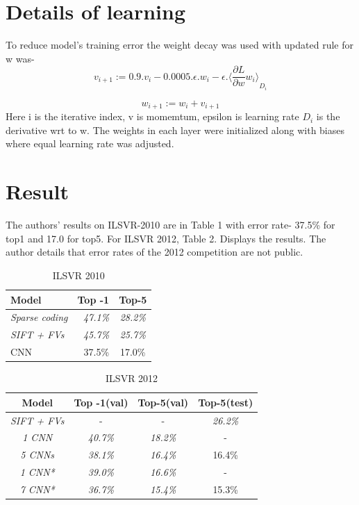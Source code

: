 \documentclass{article}
\begin{document}
\section{Details of learning}
To reduce model’s training error the weight decay was used with updated rule for w was-
$$v_{i+1} := 0.9 .v_i -0.0005 . \epsilon . w_i - \epsilon . {\langle
{\frac{\partial L}{\partial w}{w_i}}\rangle}_{D_i}$$

$$ w_{i+1} := w_i + v_{i+1}$$
\vspace{0.1in}
Here i is the iterative index,
v is momemtum, epsilon is learning rate ${D_i}$ is the derivative wrt to w.
The weights in each layer were initialized along with biases where equal learning rate was adjusted.
\section{Result}
The authors’ results on ILSVR-2010 are in Table 1 with error rate- 37.5\% for top1 and 17.0 for top5. For ILSVR 2012, Table 2. Displays the results. The author details that error  rates of the 2012 competition are not public.

\begin{table}[!htb]
\centering
\begin{tabular}{|l|r|c|}
\hline
\textbf{{Model}} & \textbf{{Top -1}}& \textbf{{Top-5}} \\ \hline
\emph{Sparse coding\cite{berg2010large}} & \emph{47.1\%} & \emph{28.2\%} \\ \hline
\emph{SIFT + FVs\cite{sanchez2011high}} & \emph{45.7\%} & \emph{25.7\%} \\ \hline
{CNN} & {37.5\%} & {17.0\%} \\ \hline
    \end{tabular}
    \caption{ILSVR 2010}
    \label{tab:my_label}
\end{table}

\begin{table}[!htb]
\centering
\begin{tabular}{|c|c|c|c|}
\hline
{\textbf{Model}} & \textbf{{Top -1(val)}} & \textbf{{Top-5(val)}} & \textbf{{Top-5(test)}} \\ \hline
\emph{SIFT + FVs} & - & - & \emph{26.2\%} \\ \hline
\emph{1 CNN} & \emph{40.7\%} & \emph{18.2\%} & {-} \\ \hline
\emph{5 CNNs} & \emph{38.1\%} & \emph{16.4\%} & {16.4\%} \\ \hline
\emph{1 CNN*} & \emph{39.0\%} & \emph{16.6\%} & {-} \\ \hline
\emph{7 CNN*} & \emph{36.7\%} & \emph{15.4\%} & {15.3\%} \\ \hline
    \end{tabular}
    \caption{ILSVR 2012}
    \label{tab:my_label}
\end{table}
\end{document}
